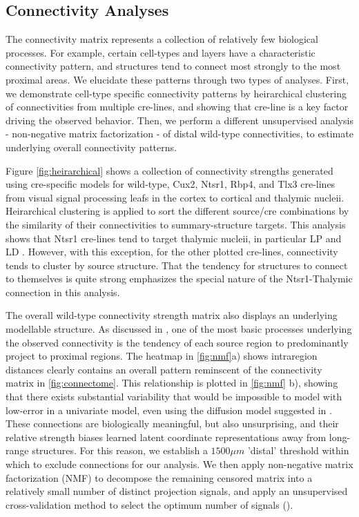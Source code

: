 \documentclass[NETN,manuscript]{stjour-new}
\newcommand{\skcomment}[1]{({\color{blue}{SK's comment:}}\textbf{\color{blue}{#1}})}
\begin{document}
\subsection{Connectivity Analyses}


The connectivity matrix represents a collection of relatively few biological processes.
For example, certain cell-types and layers have a characteristic connectivity pattern, and structures tend to connect most strongly to the most proximal areas.
We elucidate these patterns through two types of analyses. 
First, we demonstrate cell-type specific connectivity patterns by heirarchical clustering of connectivities from multiple cre-lines, and showing that cre-line is a key factor driving the observed behavior. 
Then, we perform a different unsupervised analysis - non-negative matrix factorization - of distal wild-type connectivities, to estimate underlying overall connectivity patterns.

Figure \ref{fig:heirarchical} shows a collection of connectivity strengths generated using cre-specific models for wild-type, Cux2, Ntsr1, Rbp4, and Tlx3 cre-lines from visual signal processing leafs in the cortex to cortical and thalymic nucleii.
Heirarchical clustering is applied to sort the different source/cre combinations by the similarity of their connectivities to summary-structure targets.
This analysis shows that Ntsr1 cre-lines tend to target thalymic nucleii, in particular LP and LD \citet{Jeong2016-dc}.
However, with this exception, for the other plotted cre-lines, connectivity tends to cluster by source structure.
That the tendency for structures to connect to themselves is quite strong emphasizes the special nature of the Ntsr1-Thalymic connection in this analysis.

The overall wild-type connectivity strength matrix also displays an underlying modellable structure.
As discussed in \citet{Knox2019-ot}, one of the most basic processes underlying the observed connectivity is the tendency of each source region to predominantly project to proximal regions.
The heatmap in \ref{fig:nmf}a) shows intraregion distances clearly contains an overall pattern reminscent of the connectivity matrix in \ref{fig:connectome}.
This relationship is plotted in \ref{fig:nmf} b), showing that there exists substantial variability that would be impossible to model with low-error in a univariate model, even using the diffusion model suggested in \citet{Knox2019-ot}.
These connections are biologically meaningful, but also unsurprising, and their relative strength biases learned latent coordinate representations away from long-range structures.
For this reason, we establish a $1500 \mu m$ 'distal' threshold within which to exclude connections for our analysis.
We then apply non-negative matrix factorization (NMF) to decompose the remaining censored matrix into a relatively small number of distinct projection signals, and apply an unsupervised cross-validation method to select the optimum number of signals \skcomment{Percent error... show reconstruction? log scale?}.
\end{document}
